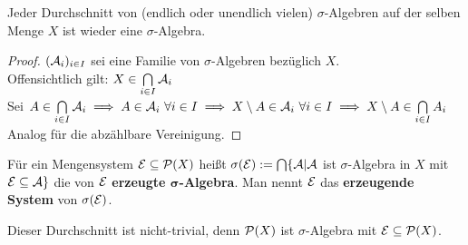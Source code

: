   \begin{theorem}
    Jeder Durchschnitt von (endlich oder unendlich vielen) $\sigma$-Algebren auf der selben Menge $X$ ist wieder eine $\sigma$-Algebra.
  \end{theorem}

  \begin{proof}
    $(\mathcal{A}_i)_{i \in I}$ sei eine Familie von $\sigma$-Algebren bezüglich $X$.\\
    Offensichtlich gilt: $X \in \bigcap\limits_{i \in I} \mathcal{A}_i$\\
    Sei $A \in \bigcap\limits_{i \in I} \mathcal{A}_i \implies A \in \mathcal{A}_i \ \forall i \in I \implies X \setminus A \in \mathcal{A}_i \ \forall i \in I \implies X \setminus A \in \bigcap\limits_{i \in I} A_i$\\
    Analog für die abzählbare Vereinigung.
  \end{proof}

  \begin{definition}
    Für ein Mengensystem $\mathcal{E} \subseteq \mathcal{P}(X)$ heißt $\sigma(\mathcal{E}) := \bigcap\{\mathcal{A}|\mathcal{A}$ ist $\sigma$-Algebra in $X$ mit $\mathcal{E} \subseteq \mathcal{A}\}$ die von $\mathcal{E}$ \textbf{erzeugte $\bm{\sigma}$-Algebra}. Man nennt $\mathcal{E}$ das \textbf{erzeugende System} von $\sigma(\mathcal{E})$.
  \end{definition}

  \begin{remark}
    Dieser Durchschnitt ist nicht-trivial, denn $\mathcal{P}(X)$ ist $\sigma$-Algebra mit $\mathcal{E} \subseteq \mathcal{P}(X)$.
  \end{remark}

